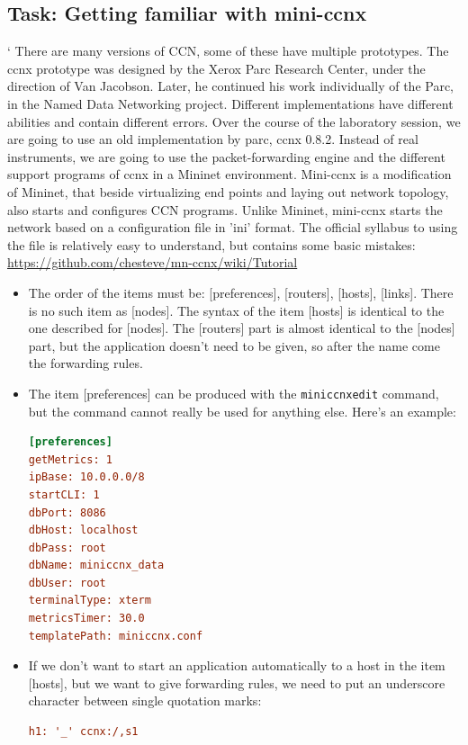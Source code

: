 \documentclass[a4paper]{article}
\begin{document}
\subsection{Task: Getting familiar with mini-ccnx}
`
There are many versions of CCN, some of these have multiple prototypes. The ccnx prototype was 
designed by the Xerox Parc Research Center, under the direction of Van Jacobson. Later, he continued
his work individually of the Parc, in the Named Data Networking project. Different implementations 
have different abilities and contain different errors. Over the course of the laboratory session, 
we are going to use an old implementation by parc, ccnx 0.8.2. Instead of real instruments, we are
going to use the packet-forwarding engine and the different support programs of ccnx in a Mininet
environment. Mini-ccnx is a modification of Mininet, that beside virtualizing end points and 
laying out network topology, also starts and configures CCN programs. Unlike Mininet, mini-ccnx
starts the network based on a configuration file in 'ini' format. The official syllabus to using the
file is relatively easy to understand, but contains some basic mistakes:
\url{https://github.com/chesteve/mn-ccnx/wiki/Tutorial}

\begin{itemize}

\item The order of the items must be: [preferences], [routers], [hosts], [links]. There is no 
such item as [nodes]. The syntax of the item [hosts] is identical to the one described for [nodes].
The [routers] part is almost identical to the [nodes] part, but the application doesn't need to be 
given, so after the name come the forwarding rules.
\item The item [preferences] can be produced with the \verb!miniccnxedit! command, but the command
cannot really be used for anything else. Here's an example:

\begin{lstlisting}[language=Ini,breaklines]
[preferences]
getMetrics: 1
ipBase: 10.0.0.0/8
startCLI: 1
dbPort: 8086
dbHost: localhost
dbPass: root
dbName: miniccnx_data
dbUser: root
terminalType: xterm
metricsTimer: 30.0
templatePath: miniccnx.conf
\end{lstlisting}

\item If we don't want to start an application automatically to a host in the item [hosts], but
we want to give forwarding rules, we need to put an underscore character between single quotation
marks:
\begin{lstlisting}[language=Ini,breaklines]
   h1: '_' ccnx:/,s1
\end{lstlisting}

\end{itemize}
\end{document}
